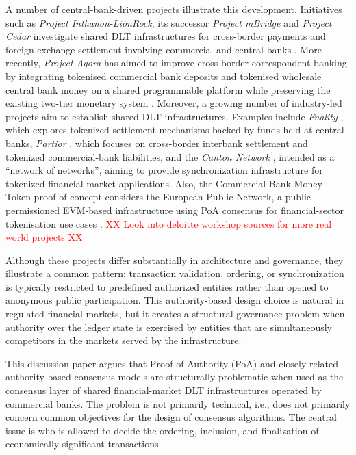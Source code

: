 \documentclass[
reprint,
showkeys,
superscriptaddress,
aps,
pra,
longbibliography,
nofootinbib,
]{revtex4-2}
\makeatletter
\theoremstyle{definition}\newtheorem{definition}{Definition}
\renewcommand\paragraph{%
	\@startsection{paragraph}{4}{\z@}%
	{1.5ex plus 0.5ex minus 0.2ex}%
	{-1em}%
	{\normalfont\normalsize\bfseries}%
}
\newcommand{\todo}[1]{\textcolor{red}{XX #1 XX}}
\makeatother
\begin{document}
A number of central-bank-driven projects illustrate this development.
Initiatives such as \emph{Project Inthanon-LionRock}, its successor \emph{Project mBridge} and \emph{Project Cedar} investigate shared DLT infrastructures for cross-border payments and foreign-exchange settlement involving commercial and central banks \cite{inthanonLionrock2020, bisMbridge2022,nyicCedarAppendix}. 
More recently, \emph{Project Agora} has aimed to improve cross-border correspondent banking by integrating tokenised commercial bank deposits and tokenised wholesale central bank money on a shared programmable platform while preserving the existing two-tier monetary system \cite{bis_press_agora_2024, bis_bulletin87_2024}.
Moreover, a growing number of industry-led projects aim to establish shared DLT infrastructures. 
Examples include \emph{Fnality} \cite{fnality}, which explores tokenized settlement mechanisms backed by funds held at central banks, \emph{Partior} \cite{partior}, which focuses on cross-border interbank settlement and tokenized commercial-bank liabilities, and the \emph{Canton Network} \cite{canton_network_whitepaper_2024}, intended as a ``network of networks'', aiming to provide synchronization infrastructure for tokenized financial-market applications. 
Also, the Commercial Bank Money Token proof of concept considers the European Public Network, a public-permissioned EVM-based infrastructure using PoA consensus for financial-sector tokenisation use cases \cite{DKBDI2024CBMT}.
\todo{Look into deloitte workshop sources for more real world projects} 


Although these projects differ substantially in architecture and governance, they illustrate a common pattern: transaction validation, ordering, or synchronization is typically restricted to predefined authorized entities rather than opened to anonymous public participation.
This authority-based design choice is natural in regulated financial markets, but it creates a structural governance problem when authority over the ledger state is exercised by entities that are simultaneously competitors in the markets served by the infrastructure.

This discussion paper argues that Proof-of-Authority (PoA) and closely related authority-based consensus models are structurally problematic when used as the consensus layer of shared financial-market DLT infrastructures operated by commercial banks.
The problem is not primarily technical, i.e., does not primarily concern common objectives for the design of consensus algorithms.
The central issue is who is allowed to decide the ordering, inclusion, and finalization of economically significant transactions.
\end{document}
